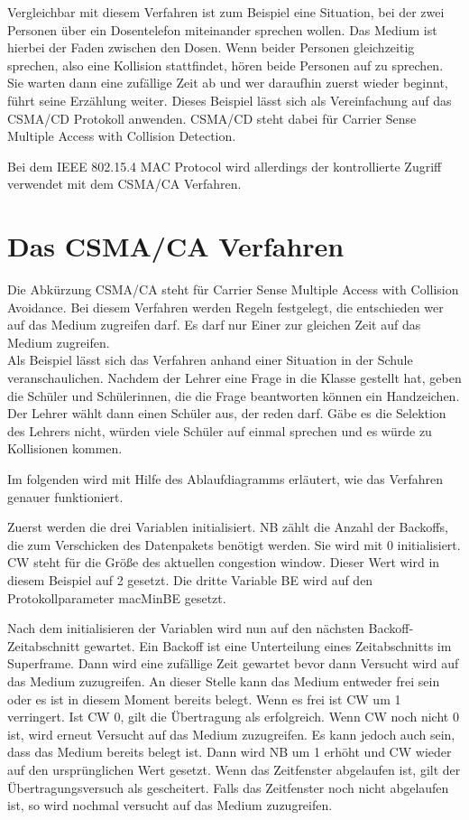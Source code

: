 \documentclass[a4paper, 12pt]{scrreprt}
\begin{document}
Vergleichbar mit diesem Verfahren ist zum Beispiel eine Situation, bei der zwei Personen über ein Dosentelefon miteinander sprechen wollen. Das Medium ist hierbei der Faden zwischen den Dosen. Wenn beider Personen gleichzeitig sprechen, also eine Kollision stattfindet, hören beide Personen auf zu sprechen. Sie warten dann eine zufällige Zeit ab und wer daraufhin zuerst wieder beginnt, führt seine Erzählung weiter.
Dieses Beispiel lässt sich als Vereinfachung auf das CSMA/CD Protokoll anwenden. CSMA/CD steht dabei für Carrier Sense Multiple Access with Collision Detection. 

Bei dem IEEE 802.15.4 MAC Protocol wird allerdings der kontrollierte Zugriff verwendet mit dem CSMA/CA Verfahren. 

\chapter{Das CSMA/CA Verfahren}
Die Abkürzung CSMA/CA steht für Carrier Sense Multiple Access with Collision Avoidance. 
Bei diesem Verfahren werden Regeln festgelegt, die entschieden wer auf das Medium zugreifen darf. Es darf nur Einer zur gleichen Zeit auf das Medium zugreifen.
\\

Als Beispiel lässt sich das Verfahren anhand einer Situation in der Schule veranschaulichen. Nachdem der Lehrer eine Frage in die Klasse gestellt hat, geben die Schüler und Schülerinnen, die die Frage beantworten können ein Handzeichen. Der Lehrer wählt dann einen Schüler aus, der reden darf. 
Gäbe es die Selektion des Lehrers nicht, würden viele Schüler auf einmal sprechen und es würde zu Kollisionen kommen.

Im folgenden wird mit Hilfe des Ablaufdiagramms erläutert, wie das Verfahren genauer funktioniert.

Zuerst werden die drei Variablen initialisiert. 
NB zählt die Anzahl der Backoffs, die zum Verschicken des Datenpakets benötigt werden. Sie wird mit 0 initialisiert. 
CW steht für die Größe des aktuellen congestion window. Dieser Wert wird in diesem Beispiel auf 2 gesetzt. Die dritte Variable BE wird auf den Protokollparameter macMinBE gesetzt.

Nach dem initialisieren der Variablen wird nun auf den nächsten Backoff-Zeitabschnitt gewartet. Ein Backoff ist eine Unterteilung eines Zeitabschnitts im Superframe.
Dann wird eine zufällige Zeit gewartet bevor dann Versucht wird auf das Medium zuzugreifen.
An dieser Stelle kann das Medium entweder frei sein oder es ist in diesem Moment bereits belegt. Wenn es frei ist CW um 1 verringert. Ist CW 0, gilt die Übertragung als erfolgreich. Wenn CW noch nicht 0 ist, wird erneut Versucht auf das Medium zuzugreifen.
Es kann jedoch auch sein, dass das Medium bereits belegt ist. Dann wird NB um 1 erhöht und CW wieder auf den ursprünglichen Wert gesetzt. Wenn das Zeitfenster abgelaufen ist, gilt der Übertragungsversuch als gescheitert. Falls das Zeitfenster noch nicht abgelaufen ist, so wird nochmal versucht auf das Medium zuzugreifen.  
\end{document}
